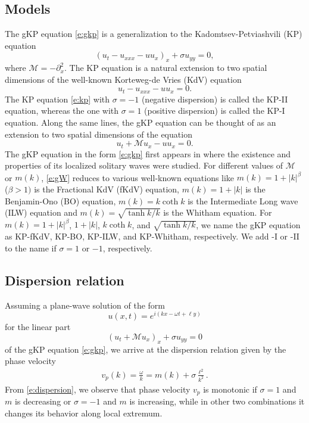 \documentclass[12pt]{amsart}    %
\newcommand{\calM}{\mathcal{M}}
\numberwithin{equation}{section}
\begin{document}
\subsection*{Models} The gKP equation \eqref{e:gkp} is a generalization to the Kadomtsev-Petviashvili (KP) equation \cite{Kadomtsev1970OnMedia}
\begin{equation}\label{e:kp}
\left( u_t-u_{xxx}-uu_x\right)_x+\sigma u_{yy}=0,
\end{equation}
where $\calM=-\partial_x^2$. The KP equation is a natural extension to two spatial dimensions of the
well-known Korteweg-de Vries (KdV) equation
\begin{equation}\label{e:kdv}
u_t-u_{xxx}-uu_x=0.
\end{equation}
The KP equation \eqref{e:kp} with $\sigma=-1$
(negative dispersion) is called the KP-II equation, whereas the one with $\sigma=1$
(positive dispersion) is
called the KP-I equation. Along the same lines, the gKP equation can be thought of as an extension to two spatial dimensions of the equation
\begin{equation}\label{e:gW}
     u_t+\calM u_x-u u_x=0.
\end{equation}
The gKP equation in the form \eqref{e:gkp} first appears in \cite{Saut1995RecentEquations} where the existence and properties of its localized solitary waves were studied. For different values of $\calM$ or $m(k)$, \eqref{e:gW} reduces to various well-known equations like $m(k) = 1+|k|^\beta$ ($\beta > 1)$ is the Fractional KdV (fKdV) equation, $m(k) = 1+|k|$ is the Benjamin-Ono (BO) equation, $m(k)=k\coth k$ is the Intermediate Long wave (ILW) equation and $m(k)=\sqrt{\tanh k/k}$ is the Whitham equation. For $m(k)=1+|k|^\beta$, $1+|k|$, $k\coth k$, and $\sqrt{\tanh k/k}$, we name the gKP equation as KP-fKdV, KP-BO, KP-ILW, and KP-Whitham, respectively. We add -I or -II to the name if $\sigma=1$ or $-1$, respectively.  

\subsection*{Dispersion relation} Assuming a plane-wave solution of the form
\[
u(x,t)=e^{i(kx-\omega t+\ell y)}
\]
for the linear part
\[
\left( u_t+\calM u_x\right)_x+\sigma u_{yy}=0
\]
of the gKP equation \eqref{e:gkp}, we arrive at the dispersion relation given by the phase velocity
\begin{align}\label{e:dispersion}
    v_p(k)=\frac{\omega}{k}=m(k)+\sigma \frac{\ell^2}{k^2}.
\end{align}
From \eqref{e:dispersion}, we observe that phase velocity $v_p$ is monotonic if $\sigma=1$ and $m$ is decreasing or $\sigma=-1$ and $m$ is increasing, while in other two combinations it changes its behavior along local extremum.
\end{document}
